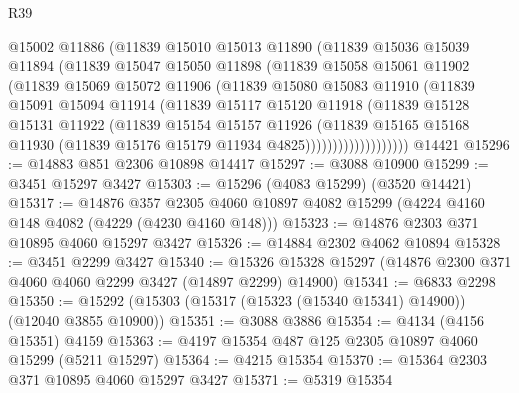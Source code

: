 \begin{lexlean}{R39}
\begin{coremodule}
                  @15002
                  @11886
                  (@11839
                    @15010
                    @15013
                    @11890
                    (@11839
                      @15036
                      @15039
                      @11894
                      (@11839
                        @15047
                        @15050
                        @11898
                        (@11839
                          @15058
                          @15061
                          @11902
                          (@11839
                            @15069
                            @15072
                            @11906
                            (@11839
                              @15080
                              @15083
                              @11910
                              (@11839
                                @15091
                                @15094
                                @11914
                                (@11839
                                  @15117
                                  @15120
                                  @11918
                                  (@11839
                                    @15128
                                    @15131
                                    @11922
                                    (@11839
                                      @15154
                                      @15157
                                      @11926
                                      (@11839
                                        @15165
                                        @15168
                                        @11930
                                        (@11839 @15176 @15179 @11934 @4825)))))))))))))))))))
    @14421
@15296 := @14883 @851 @2306 @10898 @14417
@15297 := @3088 @10900
@15299 := @3451 @15297 @3427
@15303 := @15296 (@4083 @15299) (@3520 @14421)
@15317 := @14876
    @357
    @2305
    @4060
    @10897
    @4082
    @15299
    (@4224 @4160 @148 @4082 (@4229 (@4230 @4160 @148)))
@15323 := @14876 @2303 @371 @10895 @4060 @15297 @3427
@15326 := @14884 @2302 @4062 @10894
@15328 := @3451 @2299 @3427
@15340 := @15326 @15328 @15297 (@14876 @2300 @371 @4060 @4060 @2299 @3427 (@14897 @2299) @14900)
@15341 := @6833 @2298
@15350 := @15292 (@15303 (@15317 (@15323 (@15340 @15341) @14900)) (@12040 @3855 @10900))
@15351 := @3088 @3886
@15354 := @4134 (@4156 @15351) @4159
@15363 := @4197 @15354 @487 @125 @2305 @10897 @4060 @15299 (@5211 @15297)
@15364 := @4215 @15354
@15370 := @15364 @2303 @371 @10895 @4060 @15297 @3427
@15371 := @5319 @15354

\end{coremodule}
\end{lexlean}
